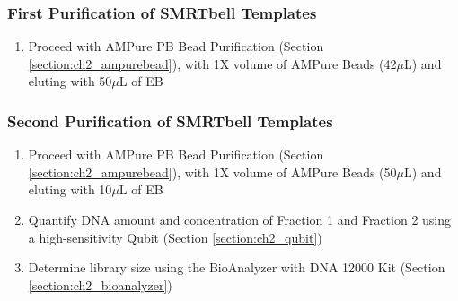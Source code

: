 \subsubsection{First Purification of SMRTbell Templates}
\begin{enumerate}
	\item Proceed with AMPure PB Bead Purification (Section \ref{section:ch2_ampurebead}), with 1X volume of AMPure Beads (42$\mu$L) and eluting with 50$\mu$L of EB
\end{enumerate} 

\subsubsection{Second Purification of SMRTbell Templates }
\begin{enumerate}
	\item Proceed with AMPure PB Bead Purification (Section \ref{section:ch2_ampurebead}), with 1X volume of AMPure Beads (50$\mu$L) and eluting with 10$\mu$L of EB
	\item Quantify DNA amount and concentration of Fraction 1 and Fraction 2 using a high-sensitivity Qubit (Section \ref{section:ch2_qubit}) 
	\item Determine library size using the BioAnalyzer with DNA 12000 Kit (Section \ref{section:ch2_bioanalyzer}) 
\end{enumerate} 